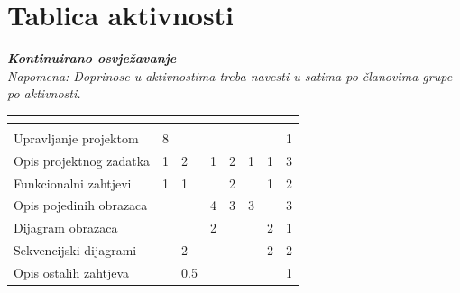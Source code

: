 		\eject
		\section*{Tablica aktivnosti}
		
			\textbf{\textit{Kontinuirano osvježavanje}}\\
			
			 \textit{Napomena: Doprinose u aktivnostima treba navesti u satima po članovima grupe po aktivnosti.}
					
						
			
			\begin{longtabu} to \textwidth {|X[7, l]|X[1, c]|X[1, c]|X[1, c]|X[1, c]|X[1, c]|X[1, c]|X[1, c]|}
								
				  &      &  &
				 &	 &	 &
				 &
				 \\ \hline 
				\endfirsthead
				
			
				  &      &  &
				 &	 &	 &
				 &
				 \\ \hline  
				\endhead
				
				
				\endfoot
							
				 
				\endlastfoot
				
				Upravljanje projektom 		&8  &  &  &  &  &  &1   \\ \hline
				Opis projektnog zadatka 	&1  &2  &1  &2  &1  &1  &3   \\ \hline
				
				Funkcionalni zahtjevi       &1  &1  &  &2  &  &1  &2    \\ \hline
				Opis pojedinih obrazaca 	&  &  &4  &3  &3  &  &3    \\ \hline
				Dijagram obrazaca 			&  &  &2  &  &  &2  &1    \\ \hline
				Sekvencijski dijagrami 		&  &2  &  &  &  &2  &2    \\ \hline
				Opis ostalih zahtjeva 		&  &0.5  &  &  &  &  &1    \\ \hline


\end{longtabu}
